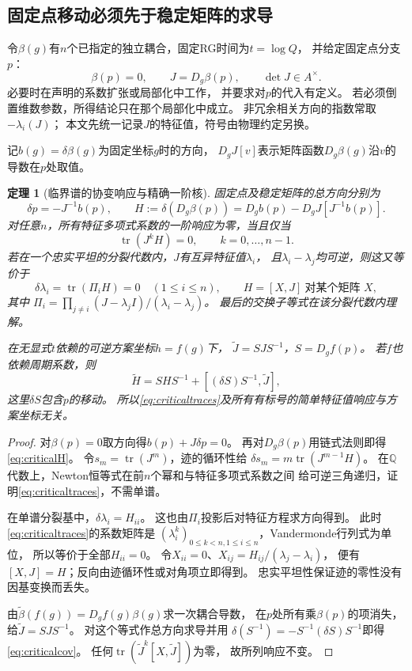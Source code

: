 \documentclass[11pt,a4paper]{ctexart}
\theoremstyle{cnplain}\newtheorem{theorem}{定理}[section]
\theoremstyle{definition}\newtheorem{definition}[theorem]{定义}
\theoremstyle{remark}\newtheorem{remark}[theorem]{注}
\newcommand{\Q}{\mathbb Q}\newcommand{\cC}{\mathcal C}
\begin{document}
\subsection{固定点移动必须先于稳定矩阵的求导}

令$\beta(g)$有$n$个已指定的独立耦合，固定RG时间为$t=\log Q$，
并给定固定点分支$p$：
\[
 \beta(p)=0,\qquad J=D_g\beta(p),\qquad \det J\in A^\times.
\]
必要时在声明的系数扩张或局部化中工作，
并要求对$p$的代入有定义。
若必须倒置维数参数，所得结论只在那个局部化中成立。
非冗余相关方向的指数常取$-\lambda_i(J)$；
本文先统一记录$J$的特征值，符号由物理约定另换。

记$b(g)=\delta\beta(g)$为固定坐标$g$时的方向，
$D_gJ[v]$表示矩阵函数$D_g\beta(g)$沿$v$的导数在$p$处取值。

\begin{theorem}[临界谱的协变响应与精确一阶核]\label{thm:criticaltrace}
固定点及稳定矩阵的总方向分别为
\[
 \delta p=-J^{-1}b(p),\qquad
 H:=\delta\!\left(D_g\beta(p)\right)
   =D_gb(p)-D_gJ[J^{-1}b(p)].
 \tag{CF2}\label{eq:criticalH}
\]
对任意$n$，所有特征多项式系数的一阶响应为零，当且仅当
\[
 \operatorname{tr}(J^kH)=0,\qquad k=0,\ldots,n-1.
 \tag{CF3}\label{eq:criticaltraces}
\]
若在一个忠实平坦的分裂代数内，$J$有互异特征值$\lambda_i$，
且$\lambda_i-\lambda_j$均可逆，则这又等价于
\[
 \delta\lambda_i=\operatorname{tr}(\Pi_iH)=0\quad(1\le i\le n),
 \qquad
 H=[X,J]\ \text{对某个矩阵 }X,
 \tag{CF4}\label{eq:commkernel}
\]
其中
$\Pi_i=\prod_{j\ne i}(J-\lambda_jI)/(\lambda_i-\lambda_j)$。
最后的交换子等式在该分裂代数内理解。

在无显式$t$依赖的可逆方案坐标$h=f(g)$下，
$\widetilde J=SJS^{-1}$，$S=D_gf(p)$。
若$f$也依赖周期系数，则
\[
 \widetilde H=SHS^{-1}
       +[(\delta S)S^{-1},\widetilde J],
 \tag{CF5}\label{eq:criticalcov}
\]
这里$\delta S$包含$p$的移动。
所以\eqref{eq:criticaltraces}及所有有标号的简单特征值响应与方案坐标无关。
\end{theorem}
\begin{proof}
对$\beta(p)=0$取方向得$b(p)+J\delta p=0$。
再对$D_g\beta(p)$用链式法则即得\eqref{eq:criticalH}。
令$s_m=\operatorname{tr}(J^m)$，迹的循环性给
$\delta s_m=m\operatorname{tr}(J^{m-1}H)$。
在$\Q$代数上，Newton恒等式在前$n$个幂和与特征多项式系数之间
给可逆三角递归，证明\eqref{eq:criticaltraces}，不需单谱。

在单谱分裂基中，$\delta\lambda_i=H_{ii}$。
这也由$\Pi_i$投影后对特征方程求方向得到。
此时\eqref{eq:criticaltraces}的系数矩阵是
$(\lambda_i^k)_{0\le k<n,1\le i\le n}$，Vandermonde行列式为单位，
所以等价于全部$H_{ii}=0$。
令$X_{ii}=0$、$X_{ij}=H_{ij}/(\lambda_j-\lambda_i)$，
便有$[X,J]=H$；反向由迹循环性或对角项立即得到。
忠实平坦性保证迹的零性没有因基变换而丢失。

由$\widetilde\beta(f(g))=D_gf(g)\beta(g)$求一次耦合导数，
在$p$处所有乘$\beta(p)$的项消失，给$\widetilde J=SJS^{-1}$。
对这个等式作总方向求导并用
$\delta(S^{-1})=-S^{-1}(\delta S)S^{-1}$即得\eqref{eq:criticalcov}。
任何$\operatorname{tr}(\widetilde J^k[X,\widetilde J])$为零，
故所列响应不变。
\end{proof}
\end{document}
